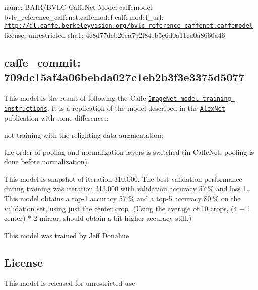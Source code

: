 

 name\+: B\+A\+I\+R/\+B\+V\+LC Caffe\+Net Model caffemodel\+: bvlc\+\_\+reference\+\_\+caffenet.\+caffemodel caffemodel\+\_\+url\+: \href{http://dl.caffe.berkeleyvision.org/bvlc_reference_caffenet.caffemodel}{\tt http\+://dl.\+caffe.\+berkeleyvision.\+org/bvlc\+\_\+reference\+\_\+caffenet.\+caffemodel} license\+: unrestricted sha1\+: 4c8d77deb20ea792f84eb5e6d0a11ca0a8660a46 \subsection*{caffe\+\_\+commit\+: 709dc15af4a06bebda027c1eb2b3f3e3375d5077 }

This model is the result of following the Caffe \href{http://caffe.berkeleyvision.org/gathered/examples/imagenet.html}{\tt Image\+Net model training instructions}. It is a replication of the model described in the \href{http://papers.nips.cc/paper/4824-imagenet-classification-with-deep-convolutional-neural-networks}{\tt Alex\+Net} publication with some differences\+:


\begin{DoxyItemize}
\item not training with the relighting data-\/augmentation;
\item the order of pooling and normalization layers is switched (in Caffe\+Net, pooling is done before normalization).
\end{DoxyItemize}

This model is snapshot of iteration 310,000. The best validation performance during training was iteration 313,000 with validation accuracy 57.\% and loss 1.. This model obtains a top-\/1 accuracy 57.\% and a top-\/5 accuracy 80.\% on the validation set, using just the center crop. (Using the average of 10 crops, (4 + 1 center) $\ast$ 2 mirror, should obtain a bit higher accuracy still.)

This model was trained by Jeff Donahue 

\subsection*{License}

This model is released for unrestricted use. 